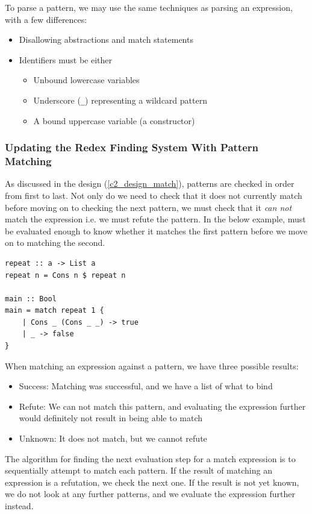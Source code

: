 To parse a pattern, we may use the same techniques as parsing an expression, with a few differences:
\begin{itemize}
    \item Disallowing abstractions and match statements
    \item Identifiers must be either
    \begin{itemize}
        \item Unbound lowercase variables
        \item Underscore (\verb|_|) representing a wildcard pattern
        \item A bound uppercase variable (a constructor)
    \end{itemize}
\end{itemize}

\subsubsection{Updating the Redex Finding System With Pattern Matching}
As discussed in the design (\ref{c2_design_match}), patterns are checked in order from first to last. Not only do we need to check that it does not currently match before moving on to checking the next pattern, we must check that it \textit{can not} match the expression i.e. we must refute the pattern. In the below example,  must be evaluated enough to know whether it matches the first pattern before we move on to matching the second. 

\begin{lstlisting}[language=SFL]
repeat :: a -> List a
repeat n = Cons n $ repeat n

main :: Bool
main = match repeat 1 {
    | Cons _ (Cons _ _) -> true
    | _ -> false
}
\end{lstlisting}

When matching an expression against a pattern, we have three possible results:

\begin{itemize}
    \item Success: Matching was successful, and we have a list of what to bind
    \item Refute: We can not match this pattern, and evaluating the expression further would definitely not result in being able to match
    \item Unknown: It does not match, but we cannot refute
\end{itemize}
\noindent The algorithm for finding the next evaluation step for a match expression is to sequentially attempt to match each pattern. If the result of matching an expression is a refutation, we check the next one. If the result is not yet known, we do not look at any further patterns, and we evaluate the expression further instead. 

